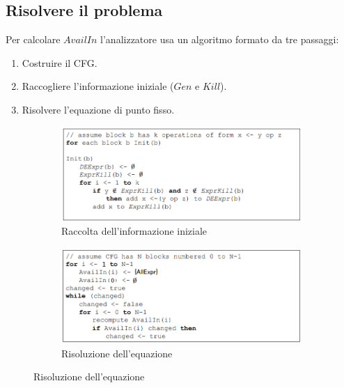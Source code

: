 \documentclass[a4paper,oneside,titlepage]{book}
\begin{document}
\subsection{Risolvere il problema}
Per calcolare $AvailIn$ l'analizzatore usa un algoritmo formato da tre passaggi:
\begin{enumerate}
    \item Costruire il CFG.
    \item Raccogliere l'informazione iniziale ($Gen$ e $Kill$).
    \item Risolvere l'equazione di punto fisso.
\end{enumerate}
\begin{figure}[htp]
	\begin{subfigure}{0.49\textwidth}
	    \centering
		\includegraphics[width=\textwidth, height=\textheight, keepaspectratio]{availExp3.png}
		\caption{Raccolta dell'informazione iniziale}
	\end{subfigure}
	\hfill
	\begin{subfigure}{0.49\textwidth}
	    \centering
		\includegraphics[width=\textwidth, height=\textheight, keepaspectratio]{availExp4.png} 
		\caption{Risoluzione dell'equazione}
	\end{subfigure}
\end{figure}
\end{document}
